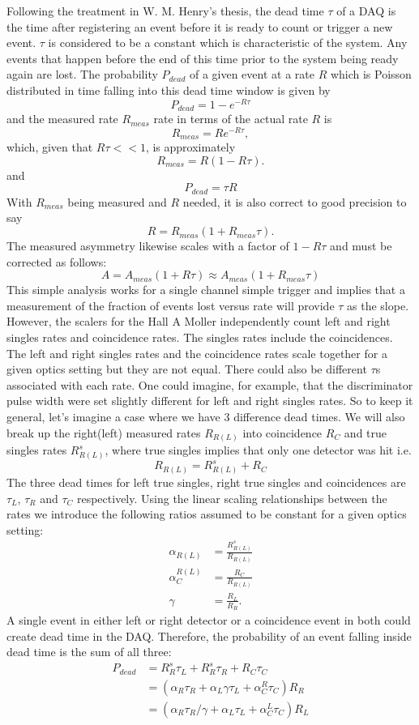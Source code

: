 \documentclass[12pt]{article}
\begin{document}
Following the treatment in W. M. Henry's thesis, the dead time $\tau$ of a DAQ is the time after registering an event before it is ready to count or trigger a new event. $\tau$ is considered to be a constant which is characteristic of the system. Any events that happen before the end of this time prior to the system being ready again are lost. The probability $P_{dead}$ of a given event at a rate $R$ which is Poisson distributed in time falling into this dead time window is given by
\[
P_{dead} = 1-e^{-R\tau}
\]
and the measured rate $R_{meas}$ rate  in terms of the actual rate $R$ is
\[
R_{meas}=Re^{-R\tau},
\]
which, given that $R\tau<<1$, is approximately
\[
R_{meas}=R(1-R\tau).
\]
and 
\begin{equation}
P_{dead}=\tau R
\label{eq:pdead}
\end{equation}
With $R_{meas}$ being measured and $R$ needed, it is also correct to good precision to say
\[
R=R_{meas}(1+R_{meas}\tau).
\]
The measured asymmetry likewise scales with a factor of $1-R\tau$ and must be corrected as follows:
\[A=A_{meas}(1+R\tau)\approx A_{meas}(1+R_{meas}\tau)
\]
This simple analysis works for a single channel simple trigger and implies that a measurement of the fraction of events lost versus rate will provide $\tau$ as the slope. However, the scalers for the Hall A Moller independently count left and right singles rates and coincidence rates. The singles rates include the coincidences. The left and right singles rates and the coincidence rates scale together for a given optics setting but they are not equal. There could also be different $\tau$s associated with each rate. One could imagine, for example, that the discriminator pulse width were set slightly different for left and right singles rates. So to keep it general, let's imagine a case where we have 3 difference dead times. We will also break up the right(left) measured rates $R_{R(L)}$ into coincidence $R_C$  and true singles rates $R^s_{R(L)}$, where true singles implies that only one detector was hit i.e.
\begin{equation}
R_{R(L)}=R^s_{R(L)}+R_C
\end{equation}
The three dead times for left true singles, right true singles and coincidences are $\tau_L$, $\tau_R$ and $\tau_C$ respectively. Using the linear scaling relationships between the rates we introduce the following ratios assumed to be constant for a given optics setting:
\begin{align}
\alpha_{R(L)}&=\frac{R^s_{R(L)}}{R_{R(L)}} \\
\alpha_C^{R(L)}&=\frac{R_C}{R_{R(L)}}\\
\gamma&=\frac{R_L}{R_R}.
\end{align} 
A single event in either left or right detector or a coincidence event in both could create dead time in the DAQ. Therefore, the probability of an event falling inside dead time is the sum of all three:
\begin{align}
P_{dead}&=R^s_R\tau_L+R^s_R\tau_R+R_C\tau_C\\
&=\left(\alpha_R\tau_R+\alpha_L\gamma\tau_L+\alpha_C^R\tau_C\right)R_R\\
&=\left(\alpha_R\tau_R/\gamma+\alpha_L\tau_L+\alpha^L_C\tau_C\right)R_L
\end{align}
\end{document}
